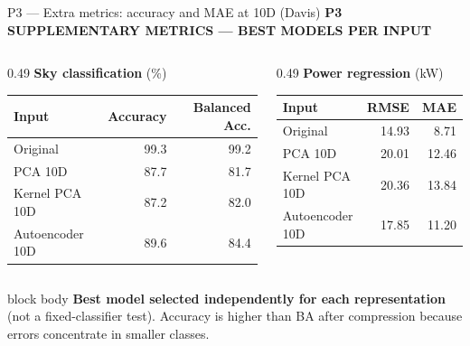 \documentclass[aspectratio=169,11pt]{beamer}
\newcommand{\sectiontag}[1]{{\footnotesize\usebeamercolor[fg]{structure}\textbf{#1}}\par\vspace{0.10cm}}
\begin{document}
\begin{frame}{P3 — Extra metrics: accuracy and MAE at 10D (Davis)}
\sectiontag{P3 \quad SUPPLEMENTARY METRICS — BEST MODELS PER INPUT}
\begin{columns}[T,totalwidth=\textwidth]
\begin{column}{0.49\textwidth}
\textbf{Sky classification} {\scriptsize(\%)}\par\vspace{0.13cm}
{\footnotesize\begin{tabular}{@{}lrr@{}}\toprule
\textbf{Input} & \textbf{Accuracy} & \textbf{Balanced Acc.}\\\midrule
Original & 99.3 & 99.2 \\
PCA 10D & 87.7 & 81.7 \\
Kernel PCA 10D & 87.2 & 82.0 \\
Autoencoder 10D & 89.6 & 84.4 \\
\bottomrule\end{tabular}}\par
\end{column}
\begin{column}{0.49\textwidth}
\textbf{Power regression} {\scriptsize(kW)}\par\vspace{0.13cm}
{\footnotesize\begin{tabular}{@{}lrr@{}}\toprule
\textbf{Input} & \textbf{RMSE} & \textbf{MAE}\\\midrule
Original & 14.93 & 8.71 \\
PCA 10D & 20.01 & 12.46 \\
Kernel PCA 10D & 20.36 & 13.84 \\
Autoencoder 10D & 17.85 & 11.20 \\
\bottomrule\end{tabular}}\par
\end{column}
\end{columns}
\vspace{0.35cm}
\begin{beamercolorbox}[sep=0.15cm,wd=\linewidth]{block body}
\footnotesize \textbf{Best model selected independently for each representation} (not a fixed-classifier test). Accuracy is higher than BA after compression because errors concentrate in smaller classes.
\end{beamercolorbox}
\end{frame}
\end{document}
